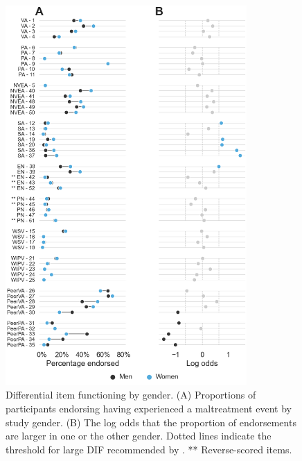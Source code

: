 \documentclass[letterpaper,man,natbib,noextraspace,floatsintext,longtable]{apa6}
\begin{document}
\begin{figure}[H]
    \centering
    \includegraphics[width=0.82\textwidth,center]{figures/figS02.png}
    \caption{\normalfont Differential item functioning by gender. (A) Proportions of participants endorsing having experienced a maltreatment event by study gender. (B) The log odds that the proportion of endorsements are larger in one or the other gender. Dotted lines indicate the threshold for large DIF recommended by \cite{hidalgo2014binary}. ** Reverse-scored items.}
    \label{fig:dif_gender}
\end{figure}
\end{document}
